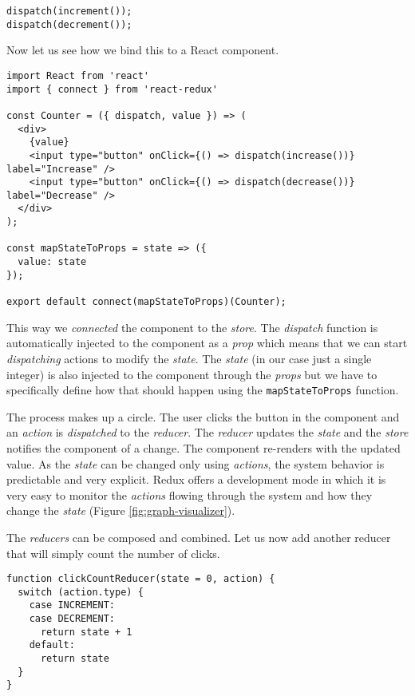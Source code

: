\begin{verbatim}
dispatch(increment());
dispatch(decrement());
\end{verbatim}

Now let us see how we bind this to a React component.

\begin{verbatim}
import React from 'react'
import { connect } from 'react-redux'

const Counter = ({ dispatch, value }) => (
  <div>
    {value}
    <input type="button" onClick={() => dispatch(increase())} label="Increase" />
    <input type="button" onClick={() => dispatch(decrease())} label="Decrease" />
  </div>
);

const mapStateToProps = state => ({
  value: state
});

export default connect(mapStateToProps)(Counter);
\end{verbatim}

This way we \emph{connected} the component to the \emph{store}. The \emph{dispatch} function is automatically injected to the component as a \emph{prop} which means that we can start \emph{dispatching} actions to modify the \emph{state}. The \emph{state} (in our case just a single integer) is also injected to the component through the \emph{props} but we have to specifically define how that should happen using the \texttt{mapStateToProps} function.

The process makes up a circle. The user clicks the button in the component and an \emph{action} is \emph{dispatched} to the \emph{reducer}. The \emph{reducer} updates the \emph{state} and the \emph{store} notifies the component of a change. The component re-renders with the updated value. As the \emph{state} can be changed only using \emph{actions}, the system behavior is predictable and very explicit. Redux offers a development mode in which it is very easy to monitor the \emph{actions} flowing through the system and how they change the \emph{state} (Figure \ref{fig:graph-visualizer}).

The \emph{reducers} can be composed and combined. Let us now add another reducer that will simply count the number of clicks.

\begin{verbatim}
function clickCountReducer(state = 0, action) {
  switch (action.type) {
    case INCREMENT:
    case DECREMENT:
      return state + 1
    default:
      return state
  }
}
\end{verbatim}

